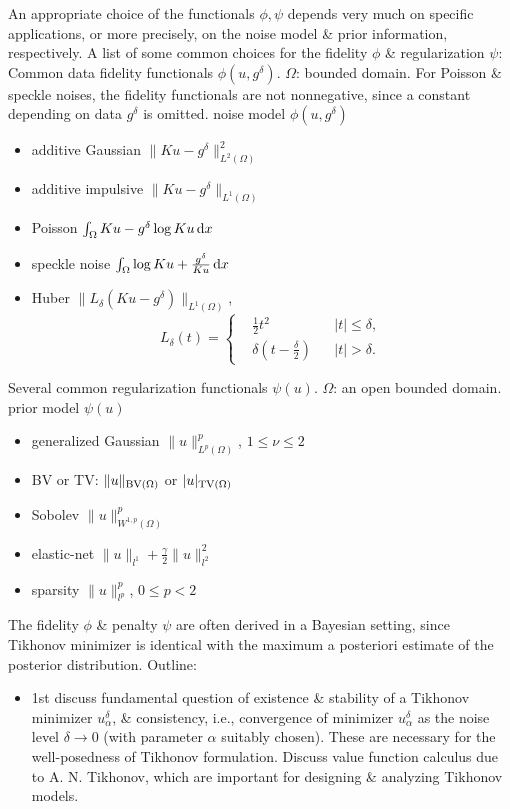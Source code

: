 \documentclass{article}
\begin{document}
\begin{itemize}
\begin{itemize}
		An appropriate choice of the functionals $\phi,\psi$ depends very much on specific applications, or more precisely, on the noise model \& prior information, respectively. A list of some common choices for the fidelity $\phi$ \& regularization $\psi$: {\sf Common data fidelity functionals $\phi(u,g^\delta)$. $\Omega$: bounded domain. For Poisson \& speckle noises, the fidelity functionals are not nonnegative, since a constant depending on data $g^\delta$ is omitted.} noise model $\phi(u,g^\delta)$
		\begin{itemize}
			\item additive Gaussian $\|Ku - g^\delta\|_{L^2(\Omega)}^2$
			\item additive impulsive $\|Ku - g^\delta\|_{L^1(\Omega)}$
			\item Poisson $\int_\Omega Ku - g^\delta\log Ku\,{\rm d}x$
			\item speckle noise $\int_\Omega \log Ku + \frac{g^\delta}{Ku}\,{\rm d}x$
			\item Huber $\|L_\delta(Ku - g^\delta)\|_{L^1(\Omega)}$,
			\begin{equation*}
				L_\delta(t) = \left\{\begin{split}
					&\frac{1}{2}t^2&&|t|\le\delta,\\
					&\delta\left(t - \frac{\delta}{2}\right)&&|t| > \delta.
				\end{split}\right.
			\end{equation*}
		\end{itemize}
		{\sf Several common regularization functionals $\psi(u)$. $\Omega$: an open bounded domain.} prior model $\psi(u)$
		\begin{itemize}
			\item generalized Gaussian $\|u\|_{L^p(\Omega)}^p$, $1\le\nu\le2$
			\item BV or TV: $\|u\|_{{\rm BV}(\Omega)}$ or $|u|_{{\rm TV}(\Omega)}$
			\item Sobolev $\|u\|_{W^{1,p}(\Omega)}^p$
			\item elastic-net $\|u\|_{l^1} + \frac{\gamma}{2}\|u\|_{l^2}^2$
			\item sparsity $\|u\|_{l^p}^p$, $0\le p < 2$
		\end{itemize}
		The fidelity $\phi$ \& penalty $\psi$ are often derived in a Bayesian setting, since Tikhonov minimizer is identical with the maximum a posteriori estimate of the posterior distribution. Outline:
		\begin{itemize}
			\item 1st discuss fundamental question of existence \& stability of a Tikhonov minimizer $u_\alpha^\delta$, \& consistency, i.e., convergence of minimizer $u_\alpha^\delta$ as the noise level $\delta\to0$ (with parameter $\alpha$ suitably chosen). These are necessary for the well-posedness of Tikhonov formulation. Discuss value function calculus due to {\sc A. N. Tikhonov}, which are important for designing \& analyzing Tikhonov models.

\end{itemize}
\end{itemize}
\end{itemize}
\end{document}
